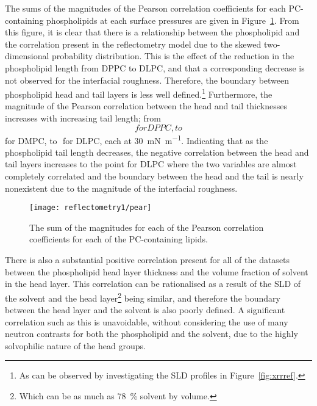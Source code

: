 The sums of the magnitudes of the Pearson correlation coefficients for each PC-containing phospholipids at each surface pressures are given in Figure~\ref{fig:pear}.
From this figure, it is clear that there is a relationship between the phospholipid and the correlation present in the reflectometry model due to the skewed two-dimensional probability distribution.
This is the effect of the reduction in the phospholipid length from DPPC to DLPC, and that a corresponding decrease is not observed for the interfacial roughness.
Therefore, the boundary between phospholipid head and tail layers is less well defined.\footnote{As can be observed by investigating the SLD profiles in Figure~\ref{fig:xrrref}.}
Furthermore, the magnitude of the Pearson correlation between the head and tail thicknesses increases with increasing tail length; from $$ for DPPC, to $$ for DMPC, to $$ for DLPC, each at \SI{30}{\milli\newton\per\meter}.
Indicating that as the phospholipid tail length decreases, the negative correlation between the head and tail layers increases to the point for DLPC where the two variables are almost completely correlated and the boundary between the head and the tail is nearly nonexistent due to the magnitude of the interfacial roughness.
%
\begin{figure}
    \centering
    \texttt{[image: reflectometry1/pear]}
    \caption{The sum of the magnitudes for each of the Pearson correlation coefficients for each of the PC-containing lipids.}
    \label{fig:pear}
\end{figure}
%

There is also a substantial positive correlation present for all of the datasets between the phospholipid head layer thickness and the volume fraction of solvent in the head layer.
This correlation can be rationalised as a result of the SLD of the solvent and the head layer\footnote{Which can be as much as \SI{78}{\percent} solvent by volume.} being similar, and therefore the boundary between the head layer and the solvent is also poorly defined.
A significant correlation such as this is unavoidable, without considering the use of many neutron contrasts for both the phospholipid and the solvent, due to the highly solvophilic nature of the head groups.

